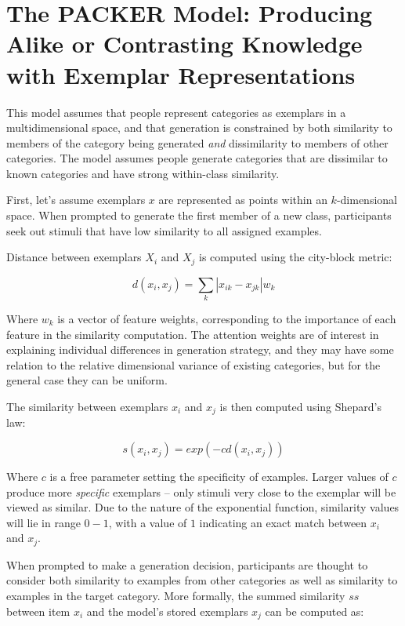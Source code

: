 \documentclass[12pt]{article}
\begin{document}
\section{The PACKER Model: Producing Alike or Contrasting Knowledge with Exemplar Representations}


This model assumes that people represent categories as exemplars in a multidimensional space, and that generation is constrained by both similarity to members of the category being generated \textit{and} dissimilarity to members of other categories. The model assumes people generate categories that are dissimilar to known categories and have strong within-class similarity.

First, let's assume exemplars $x$ are represented as points within an $k$-dimensional space. When prompted to generate the first member of a new class, participants seek out stimuli that have low similarity to all assigned examples.

Distance between exemplars $X_i$ and $X_j$ is computed using the city-block metric:

\begin{equation}
  d(x_i,x_j) = \sum_{k}{|x_{ik} - x_{jk}|}w_k
\end{equation}

Where $w_k$ is a vector of feature weights, corresponding to the importance of each feature in the similarity computation. The attention weights are of interest in explaining individual differences in generation strategy, and they may have some relation to the relative dimensional variance of existing categories, but for the general case they can be uniform.

The similarity between exemplars $x_i$ and $x_j$ is then computed using Shepard's law:

\begin{equation}
  s(x_i,x_j) = exp( {-c d(x_i,x_j)} )
\end{equation}

Where $c$ is a free parameter setting the specificity of examples. Larger values of $c$ produce more \textit{specific} exemplars -- only stimuli very close to the exemplar will be viewed as similar. Due to the nature of the exponential function, similarity values will lie in range $0-1$, with a value of $1$ indicating an exact match between $x_i$ and $x_j$.

When prompted to make a generation decision, participants are thought to consider both similarity to examples from other categories as well as similarity to examples in the target category. More formally, the summed similarity $ss$ between item $x_i$ and the model's stored exemplars $x_j$ can be computed as:
\end{document}
